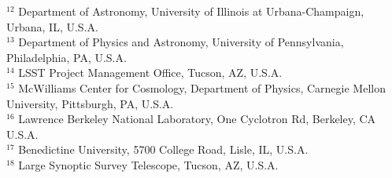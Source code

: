 {{$^{12}$ Department of Astronomy, University of Illinois at Urbana-Champaign, Urbana, IL, U.S.A.\\
$^{13}$ Department of Physics and Astronomy, University of Pennsylvania, Philadelphia, PA, U.S.A.\\
$^{14}$ LSST Project Management Office, Tucson, AZ, U.S.A.\\
$^{15}$ McWilliams Center for Cosmology, Department of Physics, Carnegie Mellon University, Pittsburgh, PA, U.S.A.\\
$^{16}$ Lawrence Berkeley National Laboratory, One Cyclotron Rd, Berkeley, CA U.S.A.\\
$^{17}$ Benedictine University, 5700 College Road, Lisle, IL, U.S.A.\\
$^{18}$ Large Synoptic Survey Telescope, Tucson, AZ, U.S.A.\\
}
}

